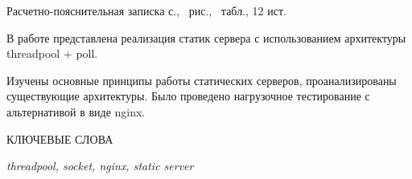 
Расчетно-пояснительная записка \pageref{LastPage} с., \totalfigures\ рис., \totaltables\ табл., 12 ист.

В работе представлена реализация статик сервера с использованием архитектуры threadpool + poll.

Изучены основные принципы работы статических серверов, проанализированы существующие архитектуры.
Было проведено нагрузочное тестирование с альтернативой в виде nginx. 

КЛЮЧЕВЫЕ СЛОВА

\textit{threadpool, socket, nginx, static server}

\clearpage
